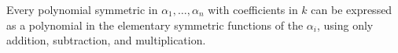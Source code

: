 Every polynomial symmetric in $\alpha_1,\ldots,\alpha_n$ with coefficients in $k$ can be expressed as a polynomial in the elementary symmetric functions of the $\alpha_i$, using only addition, subtraction, and multiplication.
